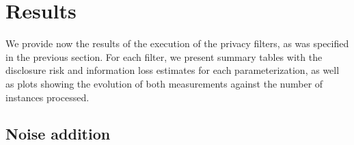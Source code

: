 \section{Results}
\label{Benchmarking:Results}

We provide now the results of the execution of the privacy filters, as was specified in the previous section. For each filter, we present summary tables with the disclosure risk and information loss estimates for each parameterization, as well as plots showing the evolution of both measurements against the number of instances processed.

\subsection{Noise addition}
\label{Benchmarking:Results:Noise}

